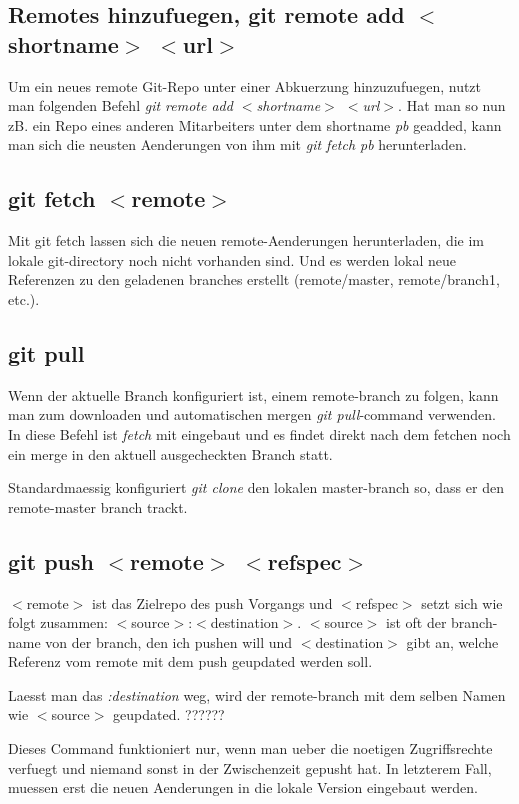 \documentclass{article}
\begin{document}
\subsection*{Remotes hinzufuegen, git remote add $<$shortname$>$ $<$url$>$}
Um ein neues remote Git-Repo unter einer Abkuerzung hinzuzufuegen, nutzt man folgenden Befehl \textit{git remote add $<$shortname$>$ $<$url$>$}. Hat man so nun zB. ein Repo eines anderen Mitarbeiters unter dem shortname \textit{pb} geadded, kann man sich die neusten Aenderungen von ihm mit \textit{git fetch pb} herunterladen.

\subsection*{git fetch $<$remote$>$}
Mit git fetch lassen sich die neuen remote-Aenderungen herunterladen, die im lokale git-directory noch nicht vorhanden sind. Und es werden lokal neue Referenzen zu den geladenen branches erstellt (remote/master, remote/branch1, etc.).

\subsection*{git pull}
Wenn der aktuelle Branch konfiguriert ist, einem remote-branch zu folgen, kann man zum downloaden und automatischen mergen \textit{git pull}-command verwenden. In diese Befehl ist \textit{fetch} mit eingebaut und es findet direkt nach dem fetchen noch ein merge in den aktuell ausgecheckten Branch statt.

Standardmaessig konfiguriert \textit{git clone} den lokalen master-branch so, dass er den remote-master branch trackt.

\subsection*{git push $<$remote$>$ $<$refspec$>$}
$<$remote$>$ ist das Zielrepo des push Vorgangs und $<$refspec$>$ setzt sich wie folgt zusammen: $<$source$>$:$<$destination$>$. $<$source$>$ ist oft der branch-name von der branch, den ich pushen will und $<$destination$>$ gibt an, welche Referenz vom remote mit dem push geupdated werden soll.

Laesst man das \textit{:destination} weg, wird der remote-branch mit dem selben Namen wie $<$source$>$ geupdated.		??????

Dieses Command funktioniert nur, wenn man ueber die noetigen Zugriffsrechte verfuegt und niemand sonst in der Zwischenzeit gepusht hat. In letzterem Fall, muessen erst die neuen Aenderungen in die lokale Version eingebaut werden.
\end{document}
